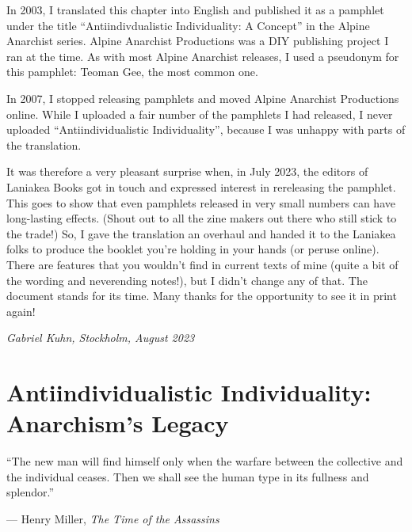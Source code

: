 In 2003, I translated this chapter into English and published it as a pamphlet
under the title “Antiindivdualistic Individuality: A Concept” in the Alpine
Anarchist series. Alpine Anarchist Productions was a DIY publishing project I
ran at the time. As with most Alpine Anarchist releases, I used a pseudonym for
this pamphlet: Teoman Gee, the most common one.

In 2007, I stopped releasing pamphlets and moved Alpine Anarchist Productions
online. While I uploaded a fair number of the pamphlets I had released, I never
uploaded “Antiindividualistic Individuality”, because I was unhappy with parts
of the translation.

It was therefore a very pleasant surprise when, in July 2023, the editors of
Laniakea Books got in touch and expressed interest in rereleasing the pamphlet.
This goes to show that even pamphlets released in very small numbers can have
long-lasting effects. (Shout out to all the zine makers out there who still
stick to the trade!) So, I gave the translation an overhaul and handed it to
the Laniakea folks to produce the booklet you’re holding in your hands (or
peruse online). There are features that you wouldn’t find in current texts of
mine (quite a bit of the wording and neverending notes!), but I didn’t change
any of that. The document stands for its time. Many thanks for the opportunity
to see it in print again!

\bigskip

\noindent\emph{Gabriel Kuhn, Stockholm, August 2023}

\clearpage

\null
\thispagestyle{empty}
\clearpage

\setcounter{page}{1}

\vspace*{2.5cm}
\section*{Antiindividualistic Individuality:\\Anarchism’s Legacy}
\vspace*{4cm}

\begin{adjustwidth}{5em}{0pt}
    \setlength{\parindent}{0pt}
    \setlength{\parskip}{0.5\baselineskip}

    “The new man will find himself only when the warfare between the collective
    and the individual ceases. Then we shall see the human type in its fullness
    and splendor.”

    — Henry Miller, \emph{The Time of the Assassins}
\end{adjustwidth}
\vspace{2\baselineskip}

